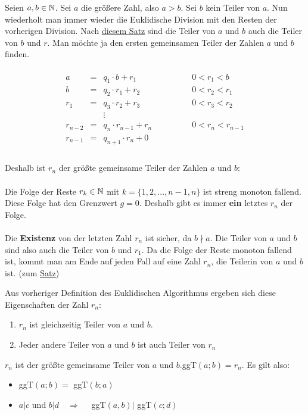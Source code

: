 \begin{Definition}

Seien $a,b \in \mathbb{N}$. Sei $a$ die größere Zahl, also $a > b$. Sei $b$ kein Teiler von $a$. Nun wiederholt man immer wieder die Euklidische Division mit den Resten der vorherigen Division. Nach \hyperlink{teiler_ab_teiler_br}{\textcolor{titlepagecolor}{\underline{diesem Satz}}} sind die Teiler von $a$ und $b$ auch die Teiler von $b$ und $r$. Man möchte ja den ersten gemeinsamen Teiler der Zahlen $a$ und $b$ finden.\\\\
$$
\begin{array}{rccl}
a & = & q_{1} \cdot b + r_{1} \qquad \qquad &0 < r_{1}  < b \\
b & = & q_{2} \cdot r_{1} + r_{2} \qquad \qquad &0 < r_{2}  < r_{1} \\
r_{1} & = & q_{3} \cdot r_{2} + r_{3} \qquad \qquad &0 < r_{3}  < r_{2} \\
 && \vdots & \\
r_{n-2} & = & q_{n} \cdot r_{n-1} + r_{n} \qquad \qquad &0 < r_{n}  < r_{n-1} \\
r_{n-1} & = & q_{n+1} \cdot r_{n} + 0 \qquad \qquad &  \\
\end{array}
$$\\
Deshalb ist $r_{n}$ der größte gemeinsame Teiler der Zahlen $a$ und $b$:\\\\
Die Folge der Reste $r_{k} \in \mathbb{N}$ mit $k = \{1, 2, ..., n-1, n\}$ ist streng monoton fallend. Diese Folge hat den Grenzwert $g = 0$. Deshalb gibt es immer \textbf{ein} letztes $r_{n}$ der Folge.\\\\
Die \textbf{Existenz} von der letzten Zahl $r_{n}$ ist sicher, da $b \nmid a$. Die Teiler von $a$ und $b$ sind also auch die Teiler von $b$ und $r_{1}$. Da die Folge der Reste monoton fallend ist, kommt man am Ende auf jeden Fall auf eine Zahl $r_{n}$, die Teilerin von $a$ und $b$ ist. (zum \hyperlink{teiler_ab_teiler_br}{\textcolor{titlepagecolor}{\underline{Satz}}})
\end{Definition}

\begin{Theorem}
Aus vorheriger Definition des Euklidischen Algorithmus ergeben sich diese Eigenschaften der Zahl $r_{n}$:
\begin{enumerate}
\item $r_{n}$ ist gleichzeitig Teiler von $a$ und $b$.
\item Jeder andere Teiler von $a$ und $b$ ist auch Teiler von $r_{n}$
\end{enumerate}
$r_{n}$ ist der größte gemeinsame Teiler von $a$ und $b$.\quad ggT$(a;b) = r_{n}$. Es gilt also:
\begin{itemize}
\item ggT$(a;b) =$ ggT$(b;a)$
\item $a | c$ und $b | d \quad \Rightarrow \quad$ ggT$(a,b) |$ ggT$(c;d)$\\
\end{itemize}
\end{Theorem}

